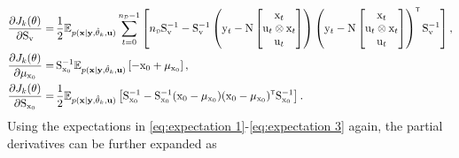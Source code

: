\begin{align}
        \pdv{J_k(\vctheta)}{\mxS_{\vcv}} =& \, \frac{1}{2}\mathbb{E}_{p(\mathbf{x}|\mathbf{y},\hat{\vctheta}_k,\mathbf{u})} \sum_{t=0}^{\nD-1} \left[\nD\mxS_\vcv^{-1} - \mxS_\vcv^{-1} \left(\vcy_t  - \mxN \begin{bmatrix} \vcx_t\\ \vcu_t \otimes \vcx_t \\ \vcu_t\end{bmatrix}\right)\left(\vcy_t - \mxN \begin{bmatrix} \vcx_t\\ \vcu_t \otimes \vcx_t \\ \vcu_t\end{bmatrix}\right)^\tr \mxS_\vcv^{-1}\right], \\ 
        \pdv{J_k(\vctheta)}{\vcmu_{\vcx_0}} =& \, \mxS_{\vcx_0}^{-1} \mathbb{E}_{p(\mathbf{x}|\mathbf{y},\hat{\vctheta}_k,\mathbf{u})} \left[-\vcx_0+\vcmu_{\vcx_0}\right],\\
        \pdv{J_k(\vctheta)}{\mxS_{\vcx_0}} =& \, \frac{1}{2}\mathbb{E}_{p(\mathbf{x}|\mathbf{y},\hat{\vctheta}_k,\mathbf{u})}  \left[\mxS_{\vcx_0}^{-1} - \mxS_{\vcx_0}^{-1} (\vcx_0-\vcmu_{\vcx_0}) (\vcx_0-\vcmu_{\vcx_0})^\tr\mxS_{\vcx_0}^{-1}\right]. 
\end{align}
Using the expectations in \eqref{eq:expectation 1}-\eqref{eq:expectation 3} again, the partial derivatives can be further expanded as
